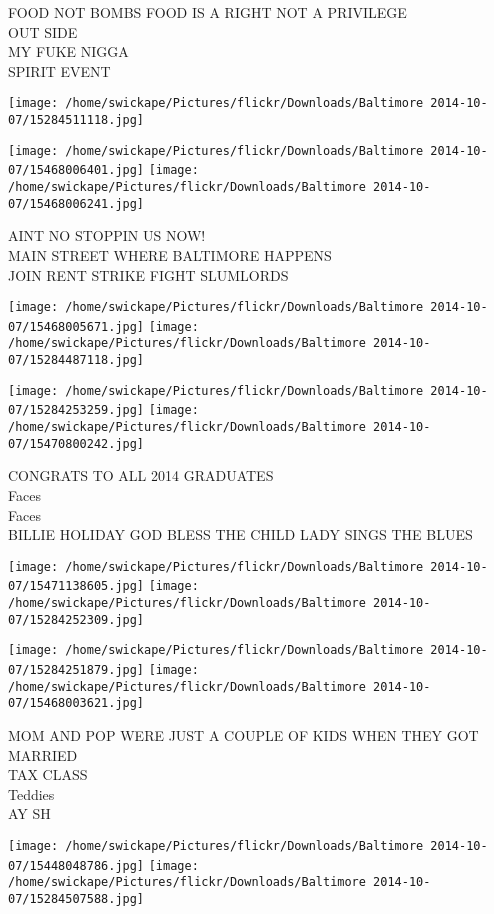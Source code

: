\documentclass[10pt,letterpaper]{article}
\begin{document}
FOOD NOT BOMBS FOOD IS A RIGHT NOT A PRIVILEGE\\
OUT SIDE\\
MY FUKE NIGGA\\
SPIRIT EVENT
\pagebreak

\texttt{[image: /home/swickape/Pictures/flickr/Downloads/Baltimore 2014-10-07/15284511118.jpg]}

\vspace{0.25in}
\texttt{[image: /home/swickape/Pictures/flickr/Downloads/Baltimore 2014-10-07/15468006401.jpg]}
\texttt{[image: /home/swickape/Pictures/flickr/Downloads/Baltimore 2014-10-07/15468006241.jpg]}

AINT NO STOPPIN US NOW!\\
MAIN STREET WHERE BALTIMORE HAPPENS\\
JOIN RENT STRIKE FIGHT SLUMLORDS
\pagebreak

\texttt{[image: /home/swickape/Pictures/flickr/Downloads/Baltimore 2014-10-07/15468005671.jpg]}
\texttt{[image: /home/swickape/Pictures/flickr/Downloads/Baltimore 2014-10-07/15284487118.jpg]}

\texttt{[image: /home/swickape/Pictures/flickr/Downloads/Baltimore 2014-10-07/15284253259.jpg]}
\texttt{[image: /home/swickape/Pictures/flickr/Downloads/Baltimore 2014-10-07/15470800242.jpg]}

CONGRATS TO ALL 2014 GRADUATES\\
Faces\\
Faces\\
BILLIE HOLIDAY GOD BLESS THE CHILD LADY SINGS THE BLUES
\pagebreak

\texttt{[image: /home/swickape/Pictures/flickr/Downloads/Baltimore 2014-10-07/15471138605.jpg]}
\texttt{[image: /home/swickape/Pictures/flickr/Downloads/Baltimore 2014-10-07/15284252309.jpg]}

\texttt{[image: /home/swickape/Pictures/flickr/Downloads/Baltimore 2014-10-07/15284251879.jpg]}
\texttt{[image: /home/swickape/Pictures/flickr/Downloads/Baltimore 2014-10-07/15468003621.jpg]}

MOM AND POP WERE JUST A COUPLE OF KIDS WHEN THEY GOT MARRIED\\
TAX CLASS\\
Teddies\\
AY SH
\pagebreak

\texttt{[image: /home/swickape/Pictures/flickr/Downloads/Baltimore 2014-10-07/15448048786.jpg]}
\texttt{[image: /home/swickape/Pictures/flickr/Downloads/Baltimore 2014-10-07/15284507588.jpg]}
\end{document}
